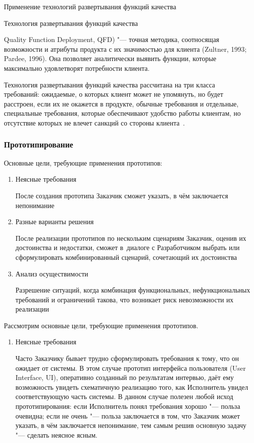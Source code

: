 \documentclass{../industrial-development}
\begin{document}
\alert{Применение технологий развертывания функций качества}

Технология развертывания функций качества {Quality Function Deployment, QFD) "--- точная методика, соотносящая возможности и атрибуты продукта с их значимостью для клиента (Zultner, 1993; Pardee, 1996). Она позволяет аналитически выявить функции, которые максимально удовлетворят потребности клиента.

Технология развертывания функций качества рассчитана на три класса требований: ожидаемые, о которых клиент может не упомянуть, но будет расстроен, если их не окажется в продукте, обычные требования и отдельные, специальные требования, которые обеспечивают удобство работы клиентам, но отсутствие которых не влечет санкций со стороны клиента~\cite[с.~49--50]{Wiegers}.


\begin{frame} \frametitle {Прототипирование}

Основные цели, требующие применения прототипов:
\begin{enumerate}
\item {Неясные требования}

{\small После создания прототипа Заказчик сможет указать, в чём заключается непонимание}


\item {Разные варианты решения}

{\small После реализации прототипов по нескольким сценариям Заказчик, оценив их достоинства и недостатки, сможет в~диалоге с Разработчиком выбрать или сформулировать комбинированный сценарий, сочетающий их достоинства}

\item {Анализ осуществимости}

{\small Разрешение ситуаций, когда комбинация функциональных, нефункциональных требований и ограничений такова, что возникает риск невозможности их реализации}

\end{enumerate}

\end{frame}

\lecturenotes

Рассмотрим основные цели, требующие применения прототипов.
\begin{enumerate}
\item \alert{Неясные требования}

Часто Заказчику бывает трудно сформулировать требования к тому, что он ожидает от системы. В этом случае прототип интерфейса
пользователя (User Interface, UI), оперативно созданный по результатам интервью, даёт ему возможность увидеть схематичную реализацию того, как Исполнитель увидел соответствующую часть системы. В данном случае полезен любой исход прототипирования: если Исполнитель понял требования хорошо "--- польза очевидна; если не очень "--- польза заключается в том, что Заказчик может указать, в чём заключается непонимание, тем самым решив основную задачу "--- сделать неясное ясным.


\end{enumerate}}
\end{document}
